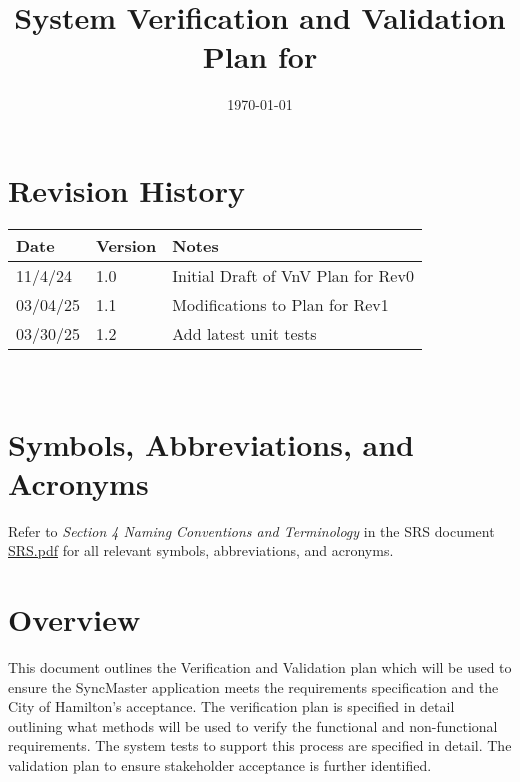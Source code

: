 \documentclass[12pt, titlepage]{article}
\begin{document}
\title{System Verification and Validation Plan for \progname{}}
\author{\authname}
\date{\today}

\maketitle


\section*{Revision History}

\begin{tabularx}{\textwidth}{p{3cm}p{2cm}X}
  \toprule {\bf Date} & {\bf Version} & {\bf Notes}\\
  \midrule
  11/4/24 & 1.0 & Initial Draft of VnV Plan for Rev0\\
  03/04/25 & 1.1 & Modifications to Plan for Rev1\\
  03/30/25 & 1.2 & Add latest unit tests\\
  \bottomrule
\end{tabularx}

~\\

\newpage

\tableofcontents

\listoftables

\section*{Symbols, Abbreviations, and Acronyms}

Refer to \textit{Section 4 Naming Conventions and Terminology} in the
SRS document
\href{https://github.com/Spitgranger/SyncMaster/blob/main/docs/SRS-Volere/SRS.pdf}{SRS.pdf}
for all relevant symbols, abbreviations, and acronyms.

\newpage


\section{Overview}

This document outlines the Verification and Validation plan which will be used
to ensure the SyncMaster application meets the requirements specification
and the City of Hamilton's acceptance. The verification plan is specified
in detail outlining what methods will be used to verify the
functional and non-functional
requirements. The system tests to support this process are specified in detail.
The validation plan to ensure stakeholder acceptance is further identified.
\end{document}
